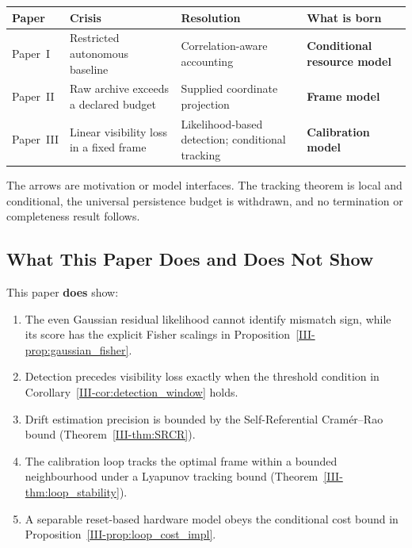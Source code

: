 \documentclass[12pt,a4paper,openany]{book}
\begin{document}
\begin{center}
\small
\setlength{\tabcolsep}{3pt}%
\begin{tabular}{@{}lP{3.2cm}P{3.8cm}l@{}}
\toprule
\textbf{Paper} & \textbf{Crisis} & \textbf{Resolution}
  & \textbf{What is born} \\
\midrule
Paper~I
  & Restricted autonomous baseline
  & Correlation-aware accounting
  & \textbf{Conditional resource model} \\[3pt]
Paper~II
  & Raw archive exceeds a declared budget
  & Supplied coordinate projection
  & \textbf{Frame model} \\[3pt]
Paper~III
  & Linear visibility loss in a fixed frame
  & Likelihood-based detection; conditional tracking
  & \textbf{Calibration model} \\
\bottomrule
\end{tabular}
\end{center}

The arrows are motivation or model interfaces.  The tracking theorem is
local and conditional, the universal persistence budget is withdrawn,
and no termination or completeness result follows.

\subsection{What This Paper Does and Does Not Show}
\label{III-subsec:claims}

This paper \textbf{does} show:
\begin{enumerate}
\item The even Gaussian residual likelihood cannot identify mismatch
  sign, while its score has the explicit Fisher scalings in
  Proposition~\ref{III-prop:gaussian_fisher}.
\item Detection precedes visibility loss exactly when the threshold
  condition in Corollary~\ref{III-cor:detection_window} holds.
\item Drift estimation precision is bounded by the
  Self-Referential Cram\'{e}r--Rao bound
  (Theorem~\ref{III-thm:SRCR}).
\item The calibration loop tracks the optimal frame
  within a bounded neighbourhood under a Lyapunov
  tracking bound
  (Theorem~\ref{III-thm:loop_stability}).
\item A separable reset-based hardware model obeys the conditional cost
  bound in Proposition~\ref{III-prop:loop_cost_impl}.
\end{enumerate}
\end{document}
